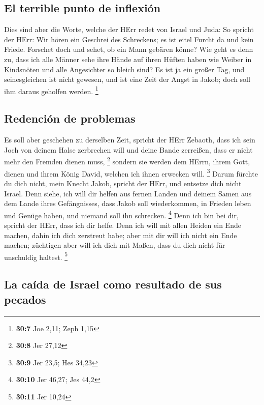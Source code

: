 \hypertarget{el-terrible-punto-de-inflexiuxf3n}{%
\subsection{El terrible punto de
inflexión}\label{el-terrible-punto-de-inflexiuxf3n}}

 Dies sind aber die Worte, welche der HErr redet von
Israel und Juda:  So spricht der HErr: Wir hören ein
Geschrei des Schreckens; es ist eitel Furcht da und kein Friede.
 Forschet doch und sehet, ob ein Mann gebären könne? Wie
geht es denn zu, dass ich alle Männer sehe ihre Hände auf ihren Hüften
haben wie Weiber in Kindsnöten und alle Angesichter so bleich sind?
 Es ist ja ein großer Tag, und seinesgleichen ist nicht
gewesen, und ist eine Zeit der Angst in Jakob; doch soll ihm daraus
geholfen werden. \footnote{\textbf{30:7} Joe 2,11; Zeph 1,15}

\hypertarget{redenciuxf3n-de-problemas}{%
\subsection{Redención de problemas}\label{redenciuxf3n-de-problemas}}

 Es soll aber geschehen zu derselben Zeit, spricht der
HErr Zebaoth, dass ich sein Joch von deinem Halse zerbrechen will und
deine Bande zerreißen, dass er nicht mehr den Fremden dienen muss,
\footnote{\textbf{30:8} Jer 27,12}  sondern sie werden dem
HErrn, ihrem Gott, dienen und ihrem König David, welchen ich ihnen
erwecken will. \footnote{\textbf{30:9} Jer 23,5; Hes 34,23}
 Darum fürchte du dich nicht, mein Knecht Jakob, spricht
der HErr, und entsetze dich nicht Israel. Denn siehe, ich will dir
helfen aus fernen Landen und deinem Samen aus dem Lande ihres
Gefängnisses, dass Jakob soll wiederkommen, in Frieden leben und Genüge
haben, und niemand soll ihn schrecken. \footnote{\textbf{30:10} Jer
  46,27; Jes 44,2}  Denn ich bin bei dir, spricht der
HErr, dass ich dir helfe. Denn ich will mit allen Heiden ein Ende
machen, dahin ich dich zerstreut habe; aber mit dir will ich nicht ein
Ende machen; züchtigen aber will ich dich mit Maßen, dass du dich nicht
für unschuldig haltest. \footnote{\textbf{30:11} Jer 10,24}

\hypertarget{la-cauxedda-de-israel-como-resultado-de-sus-pecados}{%
\subsection{La caída de Israel como resultado de sus
pecados}\label{la-cauxedda-de-israel-como-resultado-de-sus-pecados}}

